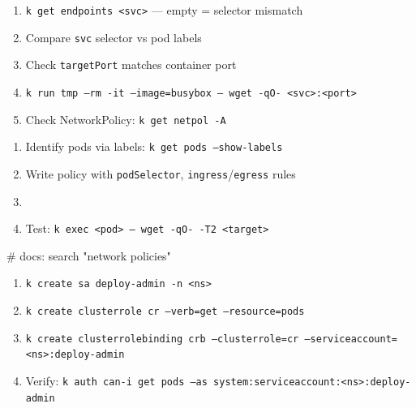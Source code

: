 \begin{tcbitemize}[
  raster columns=2, raster equal height=rows,
  blanker, cheat subtitle
]
  \tcbitem
    \begin{tcbitemize}[
      raster columns=1, raster equal height=rows,
      blanker, cheat subtitle
    ]
      \tcbitem
          {\fontsize{6.5}{7.5}\selectfont\sffamily
          \begin{enumerate}[leftmargin=1.2em, itemsep=0pt, parsep=0pt, topsep=1pt]
            \item \texttt{k get endpoints <svc>} — empty = selector mismatch
            \item Compare \texttt{svc} selector vs pod labels
            \item Check \texttt{targetPort} matches container port
            \item \texttt{k run tmp --rm -it --image=busybox -- wget -qO- <svc>:<port>}
            \item Check NetworkPolicy: \texttt{k get netpol -A}
          \end{enumerate}}

      \tcbitem
          {\fontsize{6.5}{7.5}\selectfont\sffamily
          \begin{enumerate}[leftmargin=1.2em, itemsep=0pt, parsep=0pt, topsep=1pt]
            \item Identify pods via labels: \texttt{k get pods --show-labels}
            \item Write policy with \texttt{podSelector}, \texttt{ingress}/\texttt{egress} rules
            \item {}
            \item Test: \texttt{k exec <pod> -- wget -qO- -T2 <target>}
          \end{enumerate}}
          \begin{cheatcodebash}
          # docs: search "network policies"
          \end{cheatcodebash}

      \tcbitem
          {\fontsize{6.5}{7.5}\selectfont\sffamily
          \begin{enumerate}[leftmargin=1.2em, itemsep=0pt, parsep=0pt, topsep=1pt]
            \item \texttt{k create sa deploy-admin -n <ns>}
            \item \texttt{k create clusterrole cr --verb=get --resource=pods}
            \item \texttt{k create clusterrolebinding crb --clusterrole=cr --serviceaccount=<ns>:deploy-admin}
            \item Verify: \texttt{k auth can-i get pods --as system:serviceaccount:<ns>:deploy-admin}
          \end{enumerate}}


    \end{tcbitemize}

\end{tcbitemize}
